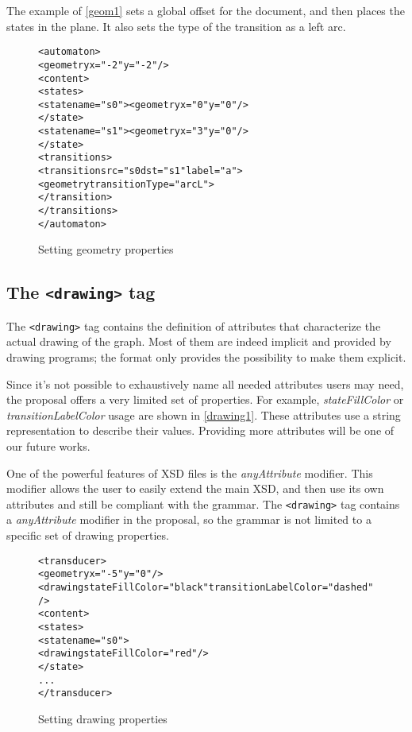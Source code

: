 \documentclass[a4paper]{article}
\newcommand{\xtag}[1]{\texttt{<#1>}}
\newcommand{\xattr}[1]{\texttt{#1}}
\def\dstname{\xattr{dst}}
\def\srcname{\xattr{src}}
\def\drawingtag{\xtag{drawing}}
\begin{document}
The example of \autoref{geom1} sets a global offset for the document,
and then places the states in the plane.  It also sets the type of the
transition as a left arc.

\begin{figure}[ht]
  \small
  \begin{center}
\begin{alltt}
<automaton>
  <geometry x="-2" y="-2"/>
  <content>
     <states>
        <state name="s0"><geometry x="0" y="0"/>
        </state>
        <state name="s1"><geometry x="3" y="0"/>
        </state>
     <transitions>
        <transition \srcname{}="s0 \dstname{}="s1" label="a">
          <geometry transitionType="arcL">
        </transition>
     </transitions>
</automaton>
\end{alltt}

\caption{Setting geometry properties}
\label{geom1}
  \end{center}
\end{figure}


\subsection{The \drawingtag{} tag}

The \drawingtag{} tag contains the definition of attributes that
characterize the actual drawing of the graph.  Most of them are indeed
implicit and provided by drawing programs; the format only provides
the possibility to make them explicit.

Since it's not possible to exhaustively name all needed attributes
users may need, the proposal offers a very limited set of properties. For
example, \textit{stateFillColor} or \textit{transitionLabelColor} usage are
shown in \autoref{drawing1}. These attributes use a string representation to
describe their values. Providing more attributes will be one of our future
works.

One of the powerful features of XSD files is the \textit{anyAttribute}
modifier. This modifier allows the user to easily extend the main XSD,
and then use its own attributes and still be compliant with the
grammar. The \drawingtag{} tag contains a \textit{anyAttribute}
modifier in the proposal, so the grammar is not limited to a specific
set of drawing properties.

\begin{figure}[ht]
  \small
  \begin{center}
\begin{alltt}
<transducer>
  <geometry x="-5" y="0"/>
  <drawing stateFillColor="black" transitionLabelColor="dashed"/>
  <content>
     <states>
        <state name="s0">
            <drawing stateFillColor="red"/>
        </state>
      ...
</transducer>
\end{alltt}

\caption{Setting drawing properties}
\label{drawing1}
  \end{center}
\end{figure}
\end{document}
